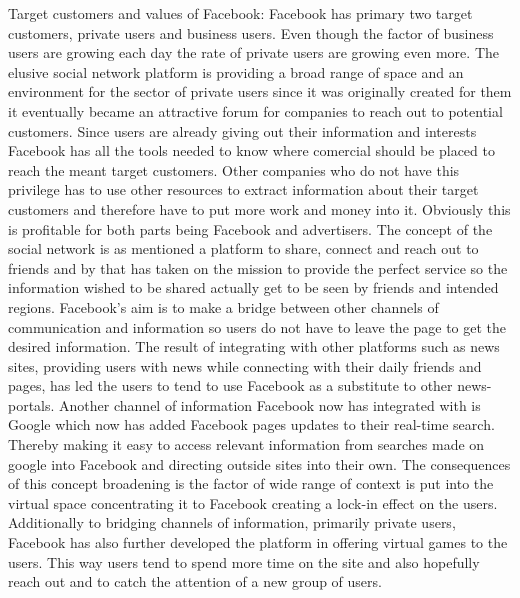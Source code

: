 \documentclass[conference]{IEEEtran}
\begin{document}
Target customers and values of Facebook:
Facebook has primary two target customers, private users and business users. Even though the factor of business users are growing each day the rate of private users are growing even more\cite{weiner2010}. The elusive social network platform is providing a broad range of space and an environment for the sector of private users since it was originally created for them it eventually became an attractive forum for companies to reach out to potential customers. Since users are already giving out their information and interests Facebook has all the tools needed to know where comercial should be placed to reach the meant target customers. Other companies who do not have this privilege has to use other resources to extract information about their target customers and therefore have to put more work and money into it. Obviously this is profitable for both parts being Facebook and advertisers. 
The concept of the social network is as mentioned a platform to share, connect and reach out to friends and by that has taken on the mission to provide the perfect service so the information wished to be shared actually get to be seen by friends and intended regions. Facebook’s aim is to make a bridge between other channels of communication and information so users do not have to leave the page to get the desired information. The result of integrating with other platforms such as news sites, providing users with news while connecting with their daily friends and pages, has led the users to tend to use Facebook as a substitute to other news-portals. Another channel of information Facebook now has integrated with is Google which now has added Facebook pages updates to their real-time search\cite{Cutler2010}. Thereby making it easy to access relevant information  from searches made on google into Facebook and directing outside sites into their own. The consequences of this concept broadening is the factor of wide range of context is put into the virtual space concentrating it to Facebook creating a lock-in effect on the users. 
    Additionally to bridging channels of information, primarily private users, Facebook has also further developed the platform in offering virtual games to the users. This way users tend to spend more time on the site and also hopefully reach out and to catch the attention of a new group of users.
\end{document}
